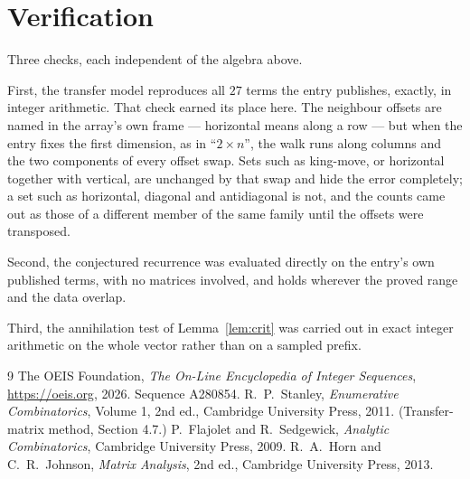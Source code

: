 \documentclass[11pt,a4paper]{article}
\theoremstyle{plain}
\theoremstyle{definition}
\begin{document}
\section{Verification}

Three checks, each independent of the algebra above.

First, the transfer model reproduces all $27$ terms the entry publishes, exactly, in
integer arithmetic. That check earned its place here. The neighbour offsets are named in the
array's own frame --- horizontal means along a row --- but when the entry fixes the first
dimension, as in ``$2\times n$'', the walk runs along columns and the two components of every
offset swap. Sets such as king-move, or horizontal together with vertical, are unchanged by
that swap and hide the error completely; a set such as horizontal, diagonal and antidiagonal
is not, and the counts came out as those of a different member of the same family until the
offsets were transposed.

Second, the conjectured recurrence was evaluated directly on the entry's own published terms,
with no matrices involved, and holds wherever the proved range and the data overlap.

Third, the annihilation test of Lemma~\ref{lem:crit} was carried out in exact integer
arithmetic on the whole vector rather than on a sampled prefix.

\begin{thebibliography}{9}
 The OEIS Foundation, \emph{The On-Line Encyclopedia of Integer
Sequences}, \url{https://oeis.org}, 2026. Sequence A280854.
 R.~P.~Stanley, \emph{Enumerative Combinatorics}, Volume 1, 2nd ed.,
Cambridge University Press, 2011. (Transfer-matrix method, Section 4.7.)
 P.~Flajolet and R.~Sedgewick, \emph{Analytic Combinatorics}, Cambridge
University Press, 2009.
 R.~A.~Horn and C.~R.~Johnson, \emph{Matrix Analysis}, 2nd ed., Cambridge
University Press, 2013.
\end{thebibliography}
\end{document}
